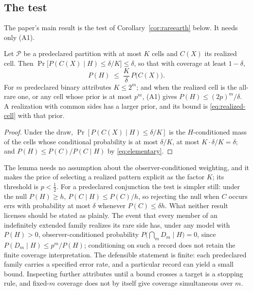\subsection{The test}\label{sec:test}

\noindent The paper's main result is the test of Corollary~\ref{cor:rareearth} below. It needs only {\rm (A1)}.

\begin{lemma}\label{lem:realized-cell}
Let $\mathcal{P}$ be a predeclared partition with at most $K$ cells and $C(X)$ its realized cell. Then $\Pr\big[P(C(X) \mid H) \le \delta/K\big] \le \delta$, so that with coverage at least $1-\delta$,
\begin{equation}\label{eq:realized-cell}
P(H) \;\le\; \frac{K}{\delta}\, P\big(C(X)\big).
\end{equation}
For $m$ predeclared binary attributes $K \le 2^m$; and when the realized cell is the all-rare one, or any cell whose prior is at most $p^m$, {\rm (A1)} gives $P(H) \le (2p)^m/\delta$. A realization with common sides has a larger prior, and its bound is \eqref{eq:realized-cell} with that prior.
\end{lemma}
\begin{proof}
Under the draw, $\Pr[P(C(X) \mid H) \le \delta/K]$ is the $H$-conditioned mass of the cells whose conditional probability is at most $\delta/K$, at most $K \cdot \delta/K = \delta$; and $P(H) \le P(C)/P(C \mid H)$ by \eqref{eq:elementary}.
\end{proof}
\noindent The lemma needs no assumption about the observer-conditioned weighting, and it makes the price of selecting a realized pattern explicit as the factor $K$; its threshold is $p < \tfrac12$. For a predeclared conjunction the test is simpler still: under the null $P(H) \ge h$, $P(C \mid H) \le P(C)/h$, so rejecting the null when $C$ occurs errs with probability at most $\delta$ whenever $P(C) \le \delta h$. What neither result licenses should be stated as plainly. The event that every member of an indefinitely extended family realizes its rare side has, under any model with $P(H) > 0$, observer-conditioned probability $P\big(\bigcap_m D_m \mid H\big) = 0$, since $P(D_m \mid H) \le p^m/P(H)$; conditioning on such a record does not retain the finite coverage interpretation. The defensible statement is finite: each predeclared family carries a specified error rate, and a particular record can yield a small bound. Inspecting further attributes until a bound crosses a target is a stopping rule, and fixed-$m$ coverage does not by itself give coverage simultaneous over $m$.

